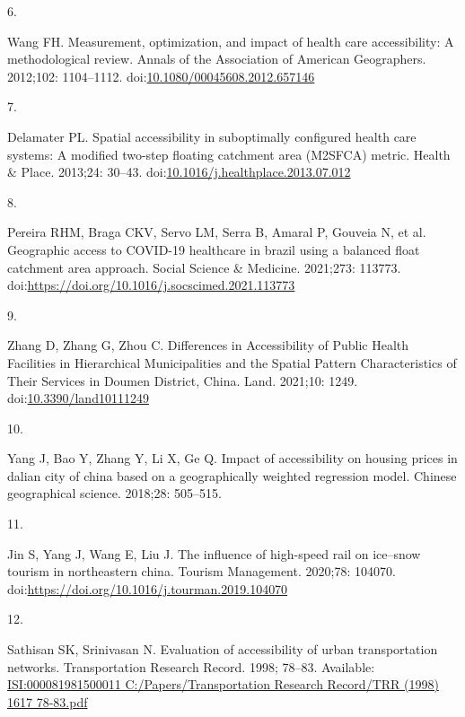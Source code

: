 \documentclass[10pt,letterpaper]{article}
\newlength{\cslhangindent}
\newlength{\csllabelwidth}
\newlength{\cslentryspacingunit} %
\newenvironment{CSLReferences}[2] %
 {%
  \setlength{\parindent}{0pt}
  \ifodd #1
  \let\oldpar\par
  \def\par{\hangindent=\cslhangindent\oldpar}
  \fi
  \setlength{\parskip}{#2\cslentryspacingunit}
 }%
 {}
\newcommand{\CSLLeftMargin}[1]{\parbox[t]{\csllabelwidth}{#1}}
\newcommand{\CSLRightInline}[1]{\parbox[t]{\linewidth - \csllabelwidth}{#1}\break}
\begin{document}
\begin{CSLReferences}{0}{0}
\leavevmode{}%
\CSLLeftMargin{6. }%
\CSLRightInline{Wang FH. Measurement, optimization, and impact of health
care accessibility: A methodological review. Annals of the Association
of American Geographers. 2012;102: 1104--1112.
doi:\href{https://doi.org/10.1080/00045608.2012.657146}{10.1080/00045608.2012.657146}}

\leavevmode{}%
\CSLLeftMargin{7. }%
\CSLRightInline{Delamater PL. Spatial accessibility in suboptimally
configured health care systems: A modified two-step floating catchment
area (M2SFCA) metric. Health \& Place. 2013;24: 30--43.
doi:\href{https://doi.org/10.1016/j.healthplace.2013.07.012}{10.1016/j.healthplace.2013.07.012}}

\leavevmode{}%
\CSLLeftMargin{8. }%
\CSLRightInline{Pereira RHM, Braga CKV, Servo LM, Serra B, Amaral P,
Gouveia N, et al. Geographic access to COVID-19 healthcare in brazil
using a balanced float catchment area approach. Social Science \&
Medicine. 2021;273: 113773.
doi:\url{https://doi.org/10.1016/j.socscimed.2021.113773}}

\leavevmode{}%
\CSLLeftMargin{9. }%
\CSLRightInline{Zhang D, Zhang G, Zhou C. Differences in {Accessibility}
of {Public Health Facilities} in {Hierarchical Municipalities} and the
{Spatial Pattern Characteristics} of {Their Services} in {Doumen
District}, {China}. Land. 2021;10: 1249.
doi:\href{https://doi.org/10.3390/land10111249}{10.3390/land10111249}}

\leavevmode{}%
\CSLLeftMargin{10. }%
\CSLRightInline{Yang J, Bao Y, Zhang Y, Li X, Ge Q. Impact of
accessibility on housing prices in dalian city of china based on a
geographically weighted regression model. Chinese geographical science.
2018;28: 505--515. }

\leavevmode{}%
\CSLLeftMargin{11. }%
\CSLRightInline{Jin S, Yang J, Wang E, Liu J. The influence of
high-speed rail on ice--snow tourism in northeastern china. Tourism
Management. 2020;78: 104070.
doi:\url{https://doi.org/10.1016/j.tourman.2019.104070}}

\leavevmode{}%
\CSLLeftMargin{12. }%
\CSLRightInline{Sathisan SK, Srinivasan N. Evaluation of accessibility
of urban transportation networks. Transportation Research Record. 1998;
78--83. Available:
\href{https://ISI:000081981500011\%0AC:/Papers/Transportation\%20Research\%20Record/TRR\%20(1998)\%201617\%2078-83.pdf}{ISI:000081981500011
C:/Papers/Transportation Research Record/TRR (1998) 1617 78-83.pdf}}


\end{CSLReferences}
\end{document}

